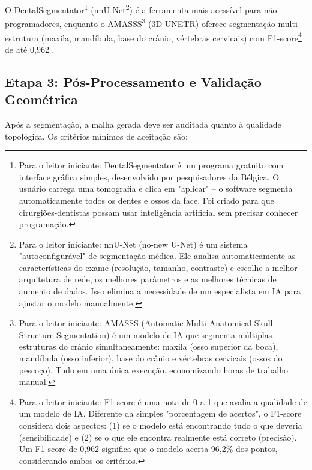 O DentalSegmentator\footnote{Para o leitor iniciante: DentalSegmentator é um programa gratuito com interface gráfica simples, desenvolvido por pesquisadores da Bélgica. O usuário carrega uma tomografia e clica em "aplicar" -- o software segmenta automaticamente todos os dentes e ossos da face. Foi criado para que cirurgiões-dentistas possam usar inteligência artificial sem precisar conhecer programação.} (nnU-Net\footnote{Para o leitor iniciante: nnU-Net (no-new U-Net) é um sistema "autoconfigurável" de segmentação médica. Ele analisa automaticamente as características do exame (resolução, tamanho, contraste) e escolhe a melhor arquitetura de rede, os melhores parâmetros e as melhores técnicas de aumento de dados. Isso elimina a necessidade de um especialista em IA para ajustar o modelo manualmente.}) é a ferramenta mais acessível para não-programadores, enquanto o AMASSS\footnote{Para o leitor iniciante: AMASSS (Automatic Multi-Anatomical Skull Structure Segmentation) é um modelo de IA que segmenta múltiplas estruturas do crânio simultaneamente: maxila (osso superior da boca), mandíbula (osso inferior), base do crânio e vértebras cervicais (ossos do pescoço). Tudo em uma única execução, economizando horas de trabalho manual.} (3D UNETR) oferece segmentação multi-estrutura (maxila, mandíbula, base do crânio, vértebras cervicais) com F1-score\footnote{Para o leitor iniciante: F1-score é uma nota de 0 a 1 que avalia a qualidade de um modelo de IA. Diferente da simples "porcentagem de acertos", o F1-score considera dois aspectos: (1) se o modelo está encontrando tudo o que deveria (sensibilidade) e (2) se o que ele encontra realmente está correto (precisão). Um F1-score de 0,962 significa que o modelo acerta 96,2\% dos pontos, considerando ambos os critérios.} de até 0,962 \cite{amasss2024}.

\subsection{Etapa 3: Pós-Processamento e Validação Geométrica}

Após a segmentação, a malha gerada deve ser auditada quanto à qualidade topológica. Os critérios mínimos de aceitação são:

